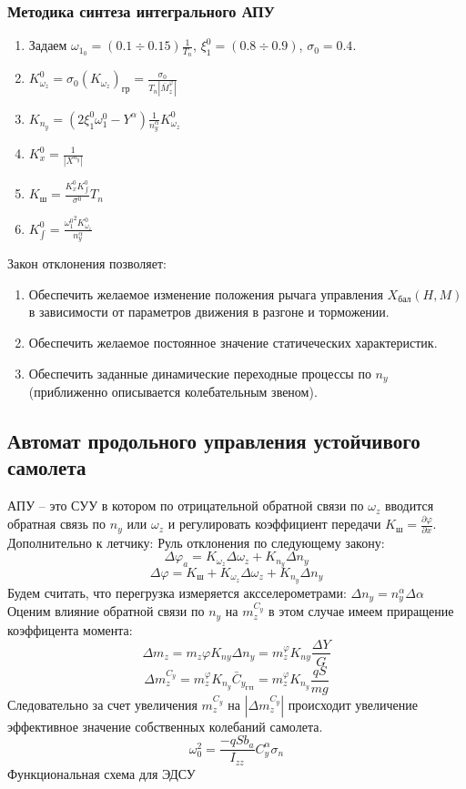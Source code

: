 \documentclass{article}
\begin{document}
\subsubsection{Методика синтеза интегрального АПУ}
\begin{enumerate}
	\item Задаем $\omega_{{1}_{0}} = (0.1 \div 0.15) \frac{1}{T_n}$, $\xi_1^0 = (0.8 \div 0.9)$, $\sigma_0 = 0.4$.
	\item $K_{\omega_z}^0 = \sigma_0 (K_{\omega_z})_\text{гр} = \frac{\sigma_0}{T_n|\bar{M}_z^\varphi|}$
	\item $K_{n_y} = (2\xi_1^0 \omega_1^0 - Y^\alpha)\frac{1}{n_y^\alpha} K_{\omega_z}^0$
	\item $K_x^0 = \frac{1}{|X^{n_y}|}$
	\item $K_\text{ш} = \frac{K_x^0 K_{\int}^0}{\sigma^0}T_n$
	\item $K_{\int}^0 = \frac{{\omega_1^0}^2 K_{\omega_z}^0}{n_y^\alpha}$
\end{enumerate}
Закон отклонения позволяет:
\begin{enumerate}
	\item Обеспечить желаемое изменение положения рычага управления $X_\text{бал}(H,M)$ в зависимости от параметров движения в разгоне и торможении.
	\item Обеспечить желаемое постоянное значение статичеческих характеристик.
	\item Обеспечить заданные динамические переходные процессы по $n_y$ (приближенно описывается колебательным звеном).
\end{enumerate}
\subsection{Автомат продольного управления устойчивого самолета}
АПУ -- это СУУ в котором по отрицательной обратной связи по $\omega_z$ вводится обратная связь по $n_y$ или $\omega_z$ и регулировать коэффициент передачи $K_\text{ш}=\frac{\partial \varphi}{\partial x}$.\\
Дополнительно к летчику:
Руль отклонения по следующему закону:
\[
	\Delta \varphi_a  = K_{\omega_z} \Delta \omega_z + K_{n_y} \Delta n_y
\]
\[
	\Delta \varphi = K_\text{ш} + K_{\omega_z}\Delta \omega_z + K_{n_y} \Delta n_y
\]
Будем считать, что перегрузка измеряется аксселерометрами: $\Delta n_y = n_y^\alpha \Delta \alpha$
Оценим влияние обратной связи по $n_y$ на $m_z^{C_y}$ в этом случае имеем приращение коэффицента момента:
\[
	\Delta m_z = m_z \varphi K_{ny}\Delta n_y = m_z^\varphi K_{ny} \frac{\Delta Y}{G}
\]
\[
	\Delta m_z^{C_y} = m_z^\varphi K_{n_y} \bar{C}_{y_\text{ГП}} = m_z^\varphi K_{n_y} \frac{qS}{mg}
\]
Следовательно за счет увеличения $m_z^{C_y}$ на $|\Delta m_z^{C_y}|$ происходит увеличение эффективное значение собственных колебаний самолета.
\[
	\omega_0^2 = \frac{-qS b_a}{I_{zz}} C_y^\alpha \sigma_n
\]
Функциональная схема для ЭДСУ
\end{document}
